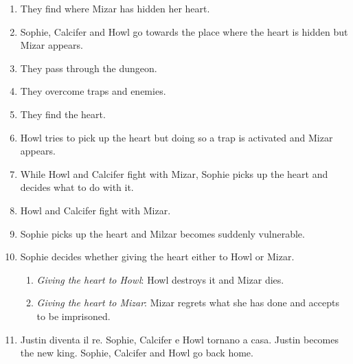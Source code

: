 \begin{enumerate}
\begin{enumerate}
		\item They find where Mizar has hidden her heart.
	
		\item Sophie, Calcifer and Howl go towards the place where the heart is hidden but Mizar appears.
	
		\item They pass through the dungeon.
	
		\item They overcome traps and enemies.
	
		\item They find the heart.
	
		\item Howl tries to pick up the heart but doing so a trap is activated and Mizar appears.
	
		\item While Howl and Calcifer fight with Mizar, Sophie picks up the heart and decides what to do with it.
	
		\item Howl and Calcifer fight with Mizar.
	
		\item Sophie picks up the heart and Milzar becomes suddenly vulnerable.
	
		\item Sophie decides whether giving the heart  either to Howl or Mizar.
	
		\begin{enumerate}
			\item \textit{Giving the heart to Howl}: Howl destroys it and Mizar dies.
		
			\item \textit{Giving the heart to Mizar}: Mizar regrets what she has done and accepts to be imprisoned.
		\end{enumerate}
		
		\item Justin diventa il re. Sophie, Calcifer e Howl tornano a casa. Justin becomes the new king. Sophie, Calcifer and Howl go back home.
	\end{enumerate}

	\end{enumerate}

